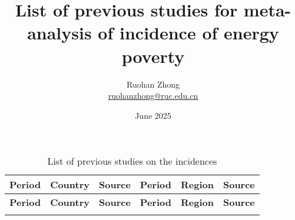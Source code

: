 \documentclass{article}
\title{List of previous studies for meta-analysis of incidence of energy poverty}
\author{Ruohan Zhong\\ \href{mailto:ruohanzhong@ruc.edu.cn}{ruohanzhong@ruc.edu.cn}}
\date{June 2025}
\begin{document}
\maketitle

\newpage

\begin{xltabular}{\textwidth}{
    >{\RaggedRight}p{1.3cm} 
    >{\RaggedRight}p{1.4cm}
    >{\RaggedRight}X |
    >{\RaggedRight}p{1.3cm} 
    >{\RaggedRight}p{1.4cm}
    >{\RaggedRight}X
}
\caption{List of previous studies on the incidences}
\label{tab_list_incidence}\\
\hline
\textbf{Period} & \textbf{Country} & \textbf{Source} & \textbf{Period} & \textbf{Region} & \textbf{Source} \\
\hline
\endfirsthead
\hline
\textbf{Period} & \textbf{Country} & \textbf{Source} & \textbf{Period} & \textbf{Region} & \textbf{Source} \\
\hline
\endhead
\hline
{}
\endfoot
\hline
\endlastfoot


\end{xltabular}
\end{document}
